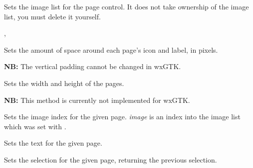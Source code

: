Sets the image list for the page control. It does not take
ownership of the image list, you must delete it yourself.


,

\label{wxnotebooksetpadding}


Sets the amount of space around each page's icon and label, in pixels.

{\bf NB:} The vertical padding cannot be changed in wxGTK.

\label{wxnotebooksetpagesize}


Sets the width and height of the pages.

{\bf NB:} This method is currently not implemented for wxGTK.

\label{wxnotebooksetpageimage}


Sets the image index for the given page. {\it image} is an index into
the image list which was set with .

\label{wxnotebooksetpagetext}


Sets the text for the given page.

\label{wxnotebooksetselection}


Sets the selection for the given page, returning the previous selection.




